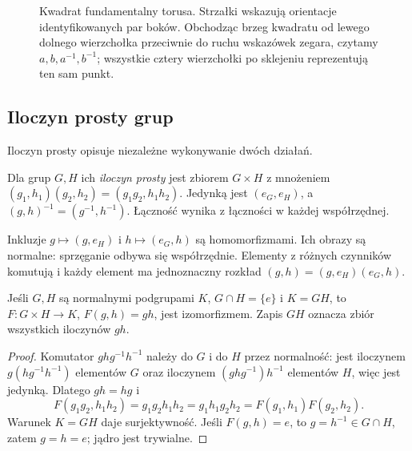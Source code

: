 \begin{figure}[htbp]
\centering
{}
\caption{Kwadrat fundamentalny torusa. Strzałki wskazują
orientacje identyfikowanych par boków. Obchodząc brzeg kwadratu
od lewego dolnego wierzchołka przeciwnie do ruchu wskazówek zegara,
czytamy $a,b,a^{-1},b^{-1}$; wszystkie cztery wierzchołki
po sklejeniu reprezentują ten sam punkt.}
\label{fig:torus-square-5}
\end{figure}


\subsection*{Iloczyn prosty grup}

Iloczyn prosty opisuje niezależne wykonywanie dwóch działań.
\begin{definicja}
Dla grup $G,H$ ich \emph{iloczyn prosty} jest zbiorem $G\times H$
z mnożeniem $(g_1,h_1)(g_2,h_2)=(g_1g_2,h_1h_2)$.
Jedynką jest $(e_G,e_H)$, a $(g,h)^{-1}=(g^{-1},h^{-1})$.
Łączność wynika z łączności w każdej współrzędnej.
\end{definicja}

Inkluzje $g\mapsto(g,e_H)$ i $h\mapsto(e_G,h)$ są homomorfizmami.
Ich obrazy są normalne: sprzęganie odbywa się współrzędnie.
Elementy z różnych czynników komutują i każdy element ma jednoznaczny
rozkład $(g,h)=(g,e_H)(e_G,h)$.

\begin{stwierdzenie}
Jeśli $G,H$ są normalnymi podgrupami $K$, $G\cap H=\{e\}$ i $K=GH$,
to $F:G\times H\to K$, $F(g,h)=gh$, jest izomorfizmem.
Zapis $GH$ oznacza zbiór wszystkich iloczynów $gh$.
\end{stwierdzenie}
\begin{proof}
Komutator $ghg^{-1}h^{-1}$ należy do $G$ i do $H$ przez normalność:
jest iloczynem $g(hg^{-1}h^{-1})$ elementów $G$ oraz
iloczynem $(ghg^{-1})h^{-1}$ elementów $H$,
więc jest jedynką. Dlatego $gh=hg$ i
\[
 F(g_1g_2,h_1h_2)=g_1g_2h_1h_2=g_1h_1g_2h_2
 =F(g_1,h_1)F(g_2,h_2).
\]
Warunek $K=GH$ daje surjektywność. Jeśli $F(g,h)=e$, to
$g=h^{-1}\in G\cap H$, zatem $g=h=e$; jądro jest trywialne.
\end{proof}

